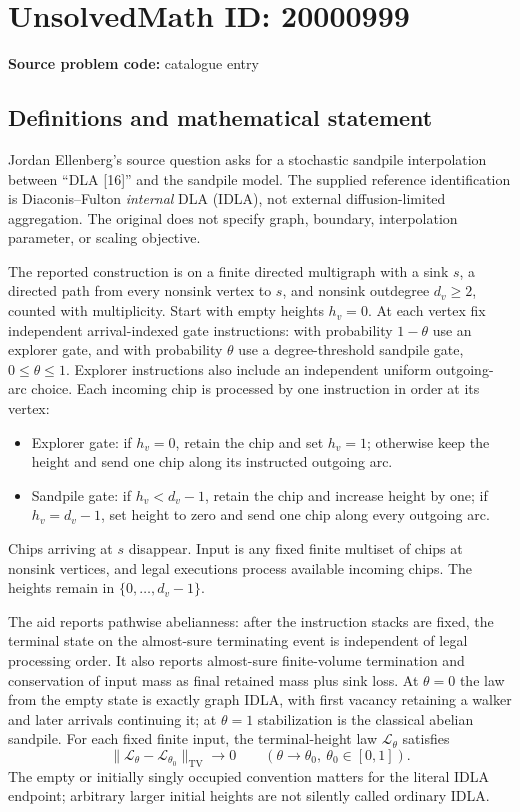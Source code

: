 \documentclass[11pt]{article}
\begin{document}
\section*{UnsolvedMath ID: 20000999}
\textbf{Source problem code:} catalogue entry
\subsection{Definitions and mathematical statement}
Jordan Ellenberg's source question asks for a stochastic sandpile interpolation between ``DLA [16]'' and the sandpile model. The supplied reference identification is Diaconis--Fulton \emph{internal} DLA (IDLA), not external diffusion-limited aggregation. The original does not specify graph, boundary, interpolation parameter, or scaling objective.

The reported construction is on a finite directed multigraph with a sink \(s\), a directed path from every nonsink vertex to \(s\), and nonsink outdegree \(d_v\geq2\), counted with multiplicity. Start with empty heights \(h_v=0\). At each vertex fix independent arrival-indexed gate instructions: with probability \(1-\theta\) use an explorer gate, and with probability \(\theta\) use a degree-threshold sandpile gate, \(0\leq\theta\leq1\). Explorer instructions also include an independent uniform outgoing-arc choice. Each incoming chip is processed by one instruction in order at its vertex:
\begin{itemize}
\item Explorer gate: if \(h_v=0\), retain the chip and set \(h_v=1\); otherwise keep the height and send one chip along its instructed outgoing arc.
\item Sandpile gate: if \(h_v<d_v-1\), retain the chip and increase height by one; if \(h_v=d_v-1\), set height to zero and send one chip along every outgoing arc.
\end{itemize}
Chips arriving at \(s\) disappear. Input is any fixed finite multiset of chips at nonsink vertices, and legal executions process available incoming chips. The heights remain in \(\{0,\ldots,d_v-1\}\).

The aid reports pathwise abelianness: after the instruction stacks are fixed, the terminal state on the almost-sure terminating event is independent of legal processing order. It also reports almost-sure finite-volume termination and conservation of input mass as final retained mass plus sink loss. At \(\theta=0\) the law from the empty state is exactly graph IDLA, with first vacancy retaining a walker and later arrivals continuing it; at \(\theta=1\) stabilization is the classical abelian sandpile. For each fixed finite input, the terminal-height law \(\mathcal L_\theta\) satisfies
\[
 \|\mathcal L_\theta-\mathcal L_{\theta_0}\|_{\mathrm{TV}}\longrightarrow0
 \qquad(\theta\to\theta_0,\ \theta_0\in[0,1]).
\]
The empty or initially singly occupied convention matters for the literal IDLA endpoint; arbitrary larger initial heights are not silently called ordinary IDLA.
\end{document}
